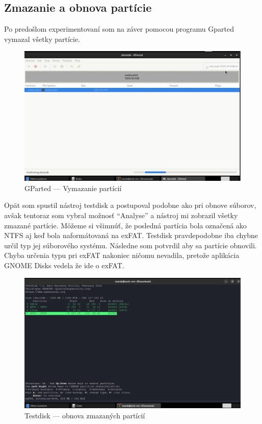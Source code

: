 \documentclass[12pt,oneside,slovak,a4paper]{article}
\begin{document}
\subsection{Zmazanie a obnova partície}
Po predošlom experimentovaní som na záver pomocou programu Gparted vymazal všetky partície.

\begin{figure}[H]
	\centering
	\includegraphics[width=\linewidth]{./images/testdisk_testing/partitions_deletion.png}
	\centering
	\captionsetup{justification=centering,margin=2cm}
	\caption{GParted --- Vymazanie partícií}
\end{figure}

Opät som spustil nástroj testdisk a postupoval podobne ako pri obnove súborov, avšak tentoraz som vybral možnosť ``Analyse'' a nástroj mi zobrazil všetky zmazané partície. Môžeme si všimnúť, že posledná partícia bola označená ako NTFS aj keď bola naformátovaná na exFAT. Testdisk pravdepodobne iba chybne určil typ jej súborového systému. Následne som potvrdil aby sa partície obnovili. Chyba určenia typu pri exFAT nakoniec ničomu nevadila, pretože aplikácia GNOME Disks vedela že ide o exFAT. 

\begin{figure}[H]
	\centering
	\includegraphics[width=\linewidth]{./images/testdisk_testing/partitions_recovery.png}
	\centering
	\captionsetup{justification=centering,margin=2cm}
	\caption{Testdisk --- obnova zmazaných partícií}
\end{figure}
\end{document}
